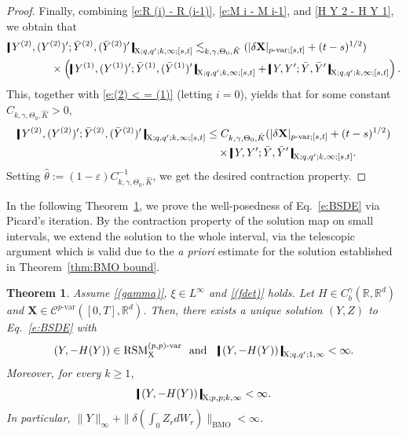 \documentclass[11pt,reqno]{amsart}
\newtheorem{theorem}[lemma]{Theorem}
\numberwithin{equation}{section}
\def\R{\mathbb R}
\newcommand{\shortthickbar}{%
  \vcenter{\hbox{\rule{1.8pt}{2.2ex}}}%
}
\newcommand{\thicknm}[1]{%
  \mathopen{\shortthickbar}%
  \mkern4mu #1 \mkern4mu%
  \mathclose{\shortthickbar}%
}
\begin{document}
\begin{proof}
Finally, combining \eqref{e:R (i) - R (i-1)}, \eqref{e:M i - M i-1}, and \eqref{H Y 2 - H Y 1}, we obtain that 
\begin{equation*}
\begin{aligned}
&\thicknm{Y^{(2)},(Y^{(2)})'; \bar Y^{(2)}, (\bar Y^{(2)})'}_{\mathrm X;q,q';k,\infty;[s,t]}\lesssim_{k,\gamma,\Theta_0,\hat K} (|\delta \mathbf X|_{p\text{-}\mathrm{var};[s,t]} + (t-s)^{1/2} )\\
&\qquad\qquad   \times \left(\thicknm{Y^{(1)},(Y^{(1)})'; \bar Y^{(1)}, (\bar Y^{(1)})'}_{\mathrm X;q,q';k,\infty;[s,t]}  + \thicknm{Y,Y'; \bar Y, \bar Y'}_{\mathrm X;q,q';k,\infty;[s,t]} \right).
\end{aligned}
\end{equation*}
This, together with \eqref{e:(2) < = (1)} (letting $i = 0$), yields that for some constant $C_{k,\gamma,\Theta_0,\hat K} > 0$, 
\begin{equation*}
\begin{aligned}
\thicknm{Y^{(2)},(Y^{(2)})'; \bar Y^{(2)}, (\bar Y^{(2)})'}_{\mathrm X;q,q';k,\infty;[s,t]} &\le C_{k,\gamma,\Theta_0,\hat K} (|\delta \mathbf X|_{p\text{-}\mathrm{var};[s,t]} + (t-s)^{1/2} )\\
&\quad \times \thicknm{Y,Y'; \bar Y, \bar Y'}_{\mathrm X;q,q';k,\infty;[s,t]}.  
\end{aligned}
\end{equation*}
Setting $\hat \theta := (1 - \varepsilon) C^{-1}_{k,\gamma,\Theta_0,\hat K}$, we get the desired contraction property. 
\end{proof}

In the following Theorem~\ref{thm:the existence}, we prove the well-posedness of  Eq.~\eqref{e:BSDE} via Picard's iteration. By the contraction property of the solution map on small intervals, we extend the solution to the whole interval, via the telescopic argument which is valid due to the \emph{a priori} estimate for the solution established in Theorem~\ref{thm:BMO bound}.


\begin{theorem}\label{thm:the existence}
Assume \ref{(gamma)}, $\xi \in L^{\infty}$ and \ref{(fdet)} holds. Let $H\in C^{\gamma}_{b}(\R,\R^d)$ and $\mathbf X\in \mathscr{C}^{p\text{-}\mathrm{var}}([0,T], \R^{d})$.
Then, there exists a unique solution $(Y,Z)$ to Eq.~\eqref{e:BSDE} with
\begin{equation*}
(Y,-H(Y))\in \mathrm{RSM}^{(p,p)\text{-}\mathrm{var}}_{\mathrm X}\ \text{ and }\ \ \thicknm{(Y,-H(Y))}_{\mathrm X;q,q';1,\infty}   < \infty.
\end{equation*}
Moreover, for every $k\ge 1$,
\begin{equation}\label{e:|(Y,-H(Y))|_X;p,p;k,infty < infty for every k}
\thicknm{(Y,-H(Y))}_{\mathrm X;p,p;k,\infty} < \infty. 
\end{equation}
In particular, $\|Y\|_{\infty} + \|\delta (\int_{0}^{\bm\cdot} Z_r dW_r)\|_{\mathrm{BMO}} < \infty$.
\end{theorem}
\end{document}
